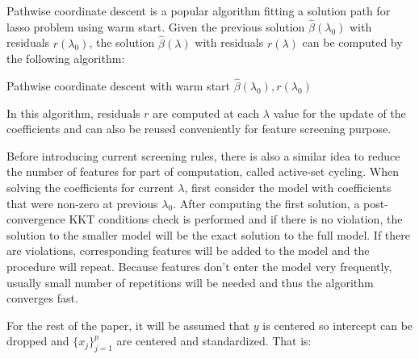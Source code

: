 \documentclass{article}
\begin{document}
Pathwise coordinate descent is a popular algorithm fitting a solution path for lasso problem using warm start. Given the previous solution $\hat{\beta}(\lambda_0)$ with residuals $r(\lambda_0)$, the solution $\hat{\beta}(\lambda)$ with residuals $r(\lambda)$ can be computed by the following algorithm:
\begin{algorithm}
    \SetAlgoLined
    \BlankLine
    \caption{Pathwise coordinate descent with warm start $\hat{\beta}(\lambda_0),r(\lambda_0)$}
\end{algorithm}

\noindent In this algorithm, residuals $r$ are computed at each $\lambda$ value for the update of the coefficients and can also be reused conveniently for feature screening purpose.

Before introducing current screening rules, there is also a similar idea to reduce the number of features for part of computation, called active-set cycling\cite{lee2007efficient}. When solving the coefficients for current $\lambda$, first consider the model with coefficients that were non-zero at previous $\lambda_0$. After computing the first solution, a post-convergence KKT conditions check is performed and if there is no violation, the solution to the smaller model will be the exact solution to the full model. If there are violations, corresponding features will be added to the model and the procedure will repeat. Because features don't enter the model very frequently, usually small number of repetitions will be needed and thus the algorithm converges fast.

For the rest of the paper, it will be assumed that $y$ is centered so intercept can be dropped and $\{x_j\}_{j=1}^p$ are centered and standardized. That is:
\end{document}
